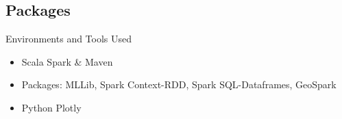 \documentclass{beamer}
\begin{document}
\subsection{Packages}

\begin{frame}{Environments and Tools Used}

\begin{itemize}
    \item Scala Spark \& Maven
    \item Packages: MLLib, Spark Context-RDD, Spark SQL-Dataframes, GeoSpark
    \item Python Plotly
\end{itemize}
\end{frame}
\end{document}
